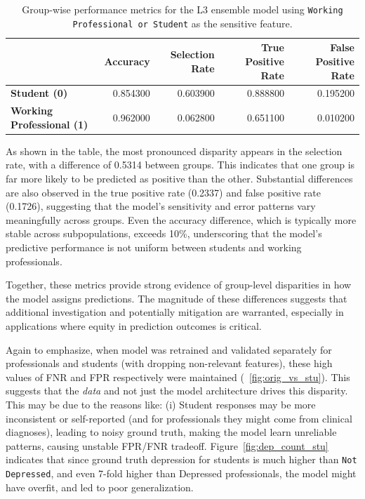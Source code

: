 \begin{table}
\caption{Group-wise performance metrics for the L3 ensemble model using \texttt{Working Professional or Student} as the sensitive feature.}
\label{tab:ensemble_fairness}
\begin{tabular}{lrrrr}
\toprule
 & Accuracy & Selection Rate & True Positive Rate & False Positive Rate \\
\midrule
\textbf{Student (0)} & 0.854300 & 0.603900 & 0.888800 & 0.195200 \\
\textbf{Working Professional (1)} & 0.962000 & 0.062800 & 0.651100 & 0.010200 \\
\bottomrule
\end{tabular}
\end{table}

As shown in the table, the most pronounced disparity appears in the selection rate, with a difference of 0.5314 between groups. This indicates that one group is far more likely to be predicted as positive than the other. Substantial differences are also observed in the true positive rate (0.2337) and false positive rate (0.1726), suggesting that the model’s sensitivity and error patterns vary meaningfully across groups. Even the accuracy difference, which is typically more stable across subpopulations, exceeds 10\%, underscoring that the model’s predictive performance is not uniform between students and working professionals.

Together, these metrics provide strong evidence of group-level disparities in how the model assigns predictions. The magnitude of these differences suggests that additional investigation and potentially mitigation are warranted, especially in applications where equity in prediction outcomes is critical.
 

Again to emphasize, when model was retrained and validated separately for professionals and students (with dropping non-relevant features), these high values of FNR and FPR respectively were maintained (~\ref{fig:orig_vs_stu}). This suggests that the \textit{data} and not just the model architecture drives this disparity. This may be due to the reasons like: (i) Student responses may be more inconsistent or self-reported (and for professionals they might come from clinical diagnoses), leading to noisy ground truth, making the model learn unreliable patterns, causing unstable FPR/FNR tradeoff. Figure~\ref{fig:dep_count_stu} indicates that since ground truth depression for students is much higher than \texttt{Not Depressed}, and even 7-fold higher than Depressed professionals, the model might have overfit, and led to poor generalization. 


